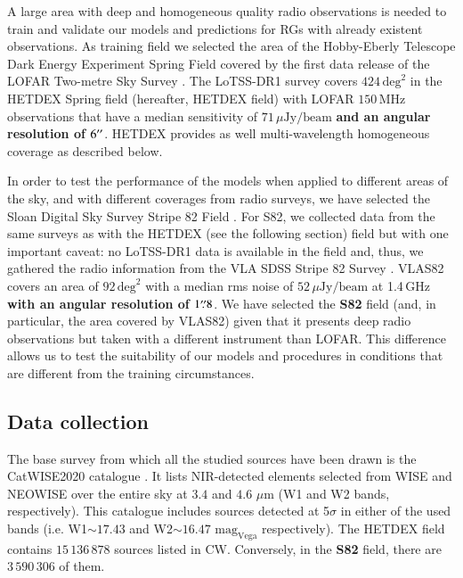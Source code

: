 \documentclass{aa}
\begin{document}
A large area with deep and homogeneous quality radio observations is needed to train and validate our models and predictions for RGs with already existent observations. As training field we selected the area of the Hobby-Eberly Telescope Dark Energy Experiment Spring Field \citep[HETDEX;][]{2008ASPC..399..115H} covered by the first data release of the LOFAR Two-metre Sky Survey \citep[LoTSS-DR1;][]{2019A&A...622A...1S}. The LoTSS-DR1 survey covers $424\, \mathrm{deg}^{2}$ in the HETDEX Spring field (hereafter, HETDEX field) with LOFAR \citep{2013A&A...556A...2V} $150\, \mathrm{MHz}$ observations that have a median sensitivity of $71\, \mu\mathrm{Jy}/\mathrm{beam}$ \textbf{and an angular resolution of $6^{\prime\prime}$}. HETDEX provides as well multi-wavelength homogeneous coverage as described below.

In order to test the performance of the models when applied to different areas of the sky, and with different coverages from radio surveys, we have selected the Sloan Digital Sky Survey \citep[SDSS,][]{2000AJ....120.1579Y} Stripe 82 Field \citep[S82,][]{2014ApJ...794..120A, 2014ApJS..213...12J}. For S82, we collected data from the same surveys as with the HETDEX (see the following section) field but with one important caveat: no LoTSS-DR1 data is available in the field and, thus, we gathered the radio information from the VLA SDSS Stripe 82 Survey \citep[VLAS82;][]{2011AJ....142....3H}. VLAS82 covers an area of $92\, \mathrm{deg}^{2}$ with a median rms noise of $52\,\mu\mathrm{Jy}/\mathrm{beam}$ at 1.4$\,$GHz \textbf{with an angular resolution of $1\overset{\prime\prime}{.} 8$}. We have selected the \textbf{S82} field (and, in particular, the area covered by VLAS82) given that it presents deep radio observations but taken with a different instrument than LOFAR. This difference allows us to test the suitability of our models and procedures in conditions that are different from the training circumstances.


\subsection{Data collection}\label{sec:data_collection}

The base survey from which all the studied sources have been drawn is the CatWISE2020 catalogue \citep[CW;][]{2021ApJS..253....8M}. It lists NIR-detected elements selected from WISE \citep{2010AJ....140.1868W} and NEOWISE \citep{2011ApJ...731...53M, 2014ApJ...792...30M} over the entire sky at $3.4$ and $4.6$ $\mu$m (W1 and W2 bands, respectively). This catalogue includes sources detected at 5$\sigma$ in either of the used bands (i.e. W1${\sim} 17.43$ and W2${\sim} 16.47$ $\mathrm{mag}_{\mathrm{Vega}}$ respectively). The HETDEX field contains $15\,136\,878$ sources listed in CW. Conversely, in the \textbf{S82} field, there are $3\,590\,306$ of them.
\end{document}
